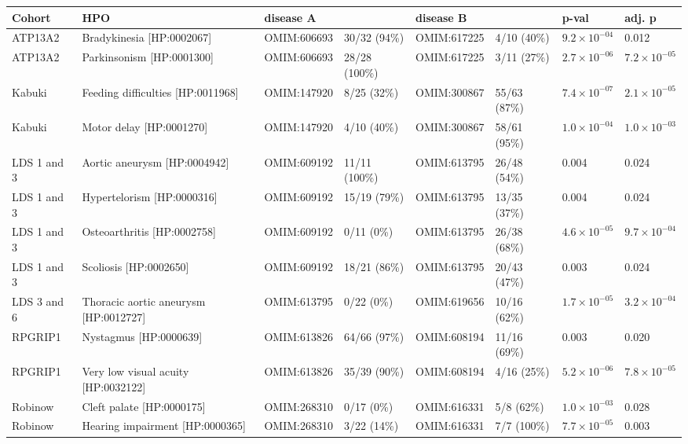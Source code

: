 \begin{fontsize}
\begin{table}
\centering
\begin{tabular}{l>{\raggedright}p{2.5cm}llllll}
\toprule
\textbf{Cohort} & \textbf{HPO} & \textbf{disease A} & \textbf{} & \textbf{disease B} & \textbf{} & \textbf{p-val} & \textbf{adj. p}\\
\midrule
ATP13A2 & Bradykinesia [HP:0002067] & OMIM:606693 & 30/32 (94\%) & OMIM:617225 & 4/10 (40\%) & $9.2 \times 10^{-04}$ & 0.012\\
ATP13A2 & Parkinsonism [HP:0001300] & OMIM:606693 & 28/28 (100\%) & OMIM:617225 & 3/11 (27\%) & $2.7 \times 10^{-06}$ & $7.2 \times 10^{-05}$\\
Kabuki & Feeding difficulties [HP:0011968] & OMIM:147920 & 8/25 (32\%) & OMIM:300867 & 55/63 (87\%) & $7.4 \times 10^{-07}$ & $2.1 \times 10^{-05}$\\
Kabuki & Motor delay [HP:0001270] & OMIM:147920 & 4/10 (40\%) & OMIM:300867 & 58/61 (95\%) & $1.0 \times 10^{-04}$ & $1.0 \times 10^{-03}$\\
LDS 1 and 3 & Aortic aneurysm [HP:0004942] & OMIM:609192 & 11/11 (100\%) & OMIM:613795 & 26/48 (54\%) & 0.004 & 0.024\\
LDS 1 and 3 & Hypertelorism [HP:0000316] & OMIM:609192 & 15/19 (79\%) & OMIM:613795 & 13/35 (37\%) & 0.004 & 0.024\\
LDS 1 and 3 & Osteoarthritis [HP:0002758] & OMIM:609192 & 0/11 (0\%) & OMIM:613795 & 26/38 (68\%) & $4.6 \times 10^{-05}$ & $9.7 \times 10^{-04}$\\
LDS 1 and 3 & Scoliosis [HP:0002650] & OMIM:609192 & 18/21 (86\%) & OMIM:613795 & 20/43 (47\%) & 0.003 & 0.024\\
LDS 3 and 6 & Thoracic aortic aneurysm [HP:0012727] & OMIM:613795 & 0/22 (0\%) & OMIM:619656 & 10/16 (62\%) & $1.7 \times 10^{-05}$ & $3.2 \times 10^{-04}$\\
RPGRIP1 & Nystagmus [HP:0000639] & OMIM:613826 & 64/66 (97\%) & OMIM:608194 & 11/16 (69\%) & 0.003 & 0.020\\
RPGRIP1 & Very low visual acuity [HP:0032122] & OMIM:613826 & 35/39 (90\%) & OMIM:608194 & 4/16 (25\%) & $5.2 \times 10^{-06}$ & $7.8 \times 10^{-05}$\\
Robinow & Cleft palate [HP:0000175] & OMIM:268310 & 0/17 (0\%) & OMIM:616331 & 5/8 (62\%) & $1.0 \times 10^{-03}$ & 0.028\\
Robinow & Hearing impairment [HP:0000365] & OMIM:268310 & 3/22 (14\%) & OMIM:616331 & 7/7 (100\%) & $7.7 \times 10^{-05}$ & 0.003\\

\end{tabular}
\end{table}
\end{fontsize}
